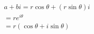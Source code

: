 \documentclass[12pt,a4paper]{letter}
\begin{document}
\begin{subequations}
\begin{align*}
a+bi=r\cos\theta+(r\sin\theta)i \\
=re^{i\theta}\\
=r(\cos\theta+i\sin\theta)
\end{align*}
\end{subequations}
\end{document}
